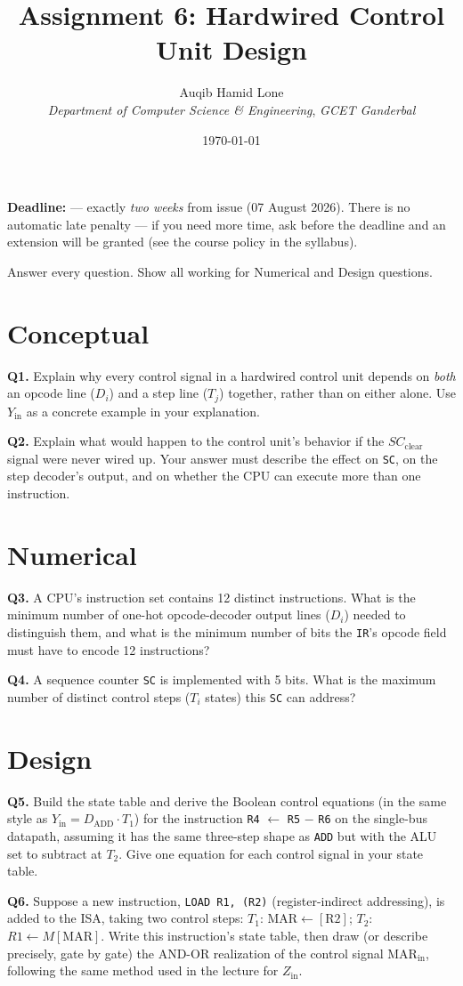\documentclass[11pt]{article}
\title{Assignment 6: Hardwired Control Unit Design}
\author{Auqib Hamid Lone\\[0.3em]
  \emph{Department of Computer Science \& Engineering}, \emph{GCET Ganderbal}}
\date{\today}
\begin{document}
\maketitle

\noindent\textbf{Deadline:}  --- exactly \emph{two weeks} from issue (07 August 2026). There is no automatic late penalty --- if you need more time, ask before the deadline and an extension will be granted (see the course policy in the syllabus).

\noindent Answer every question. Show all working for Numerical and Design questions.

\section{Conceptual}

\textbf{Q1.} Explain why every control signal in a hardwired control unit depends on \emph{both} an opcode line ($D_i$) and a step line ($T_j$) together, rather than on either alone. Use $Y_{\text{in}}$ as a concrete example in your explanation.

\textbf{Q2.} Explain what would happen to the control unit's behavior if the $SC_{\text{clear}}$ signal were never wired up. Your answer must describe the effect on \texttt{SC}, on the step decoder's output, and on whether the CPU can execute more than one instruction.

\section{Numerical}

\textbf{Q3.} A CPU's instruction set contains 12 distinct instructions. What is the minimum number of one-hot opcode-decoder output lines ($D_i$) needed to distinguish them, and what is the minimum number of bits the \texttt{IR}'s opcode field must have to encode 12 instructions?

\textbf{Q4.} A sequence counter \texttt{SC} is implemented with 5 bits. What is the maximum number of distinct control steps ($T_i$ states) this \texttt{SC} can address?

\section{Design}

\textbf{Q5.} Build the state table and derive the Boolean control equations (in the same style as $Y_{\text{in}} = D_{\text{ADD}} \cdot T_1$) for the instruction \texttt{R4} $\gets$ \texttt{R5} $-$ \texttt{R6} on the single-bus datapath, assuming it has the same three-step shape as \texttt{ADD} but with the ALU set to subtract at $T_2$. Give one equation for each control signal in your state table.

\textbf{Q6.} Suppose a new instruction, \texttt{LOAD R1, (R2)} (register-indirect addressing), is added to the ISA, taking two control steps: $T_1$: $\text{MAR} \gets [\text{R2}]$; $T_2$: $R1 \gets M[\text{MAR}]$. Write this instruction's state table, then draw (or describe precisely, gate by gate) the AND-OR realization of the control signal $\text{MAR}_{\text{in}}$, following the same method used in the lecture for $Z_{\text{in}}$.
\end{document}
